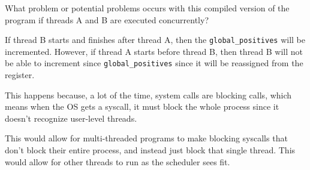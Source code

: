 \documentclass[12pt,largemargins]{homework}
\newcommand{\code}{\texttt}
\begin{document}
What problem or potential problems occurs with this compiled version of the
program if threads A and B are executed concurrently?

If thread B starts and finishes after thread A, then the
\code{global\_positives} will be incremented.
However, if thread A starts before thread B, then thread B will not be able to
increment since \code{global\_positives} since it will be reassigned from the
register.

\clearpage
{}

This happens because, a lot of the time, system calls are blocking calls,
which means when the OS gets a syscall, it must block the whole process since
it doesn't recognize user-level threads.

\clearpage
{}

This would allow for multi-threaded programs to make blocking syscalls that don't
block their entire process, and instead just block that single thread. This would
allow for other threads to run as the scheduler sees fit.
\end{document}
